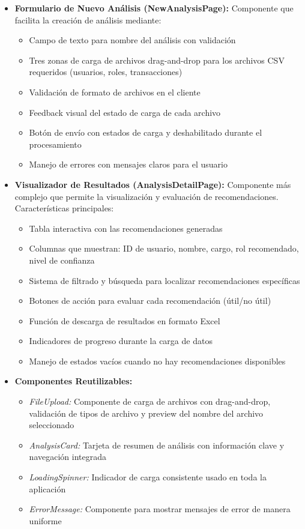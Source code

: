 \documentclass[11pt,letterpaper]{article}
\begin{document}
\begin{itemize}
\begin{itemize}
\item
  \textbf{Formulario de Nuevo Análisis (NewAnalysisPage):} Componente que facilita la 
  creación de análisis mediante:
  \begin{itemize}
  \item Campo de texto para nombre del análisis con validación
  \item Tres zonas de carga de archivos drag-and-drop para los archivos CSV requeridos 
        (usuarios, roles, transacciones)
  \item Validación de formato de archivos en el cliente
  \item Feedback visual del estado de carga de cada archivo
  \item Botón de envío con estados de carga y deshabilitado durante el procesamiento
  \item Manejo de errores con mensajes claros para el usuario
  \end{itemize}

\item
  \textbf{Visualizador de Resultados (AnalysisDetailPage):} Componente más complejo que 
  permite la visualización y evaluación de recomendaciones. Características principales:
  \begin{itemize}
  \item Tabla interactiva con las recomendaciones generadas
  \item Columnas que muestran: ID de usuario, nombre, cargo, rol recomendado, nivel de 
        confianza
  \item Sistema de filtrado y búsqueda para localizar recomendaciones específicas
  \item Botones de acción para evaluar cada recomendación (útil/no útil)
  \item Función de descarga de resultados en formato Excel
  \item Indicadores de progreso durante la carga de datos
  \item Manejo de estados vacíos cuando no hay recomendaciones disponibles
  \end{itemize}

\item
  \textbf{Componentes Reutilizables:}
  \begin{itemize}
  \item \textit{FileUpload:} Componente de carga de archivos con drag-and-drop, validación 
        de tipos de archivo y preview del nombre del archivo seleccionado
  \item \textit{AnalysisCard:} Tarjeta de resumen de análisis con información clave y 
        navegación integrada
  \item \textit{LoadingSpinner:} Indicador de carga consistente usado en toda la aplicación
  \item \textit{ErrorMessage:} Componente para mostrar mensajes de error de manera uniforme
  \end{itemize}


\end{itemize}
\end{itemize}
\end{document}
